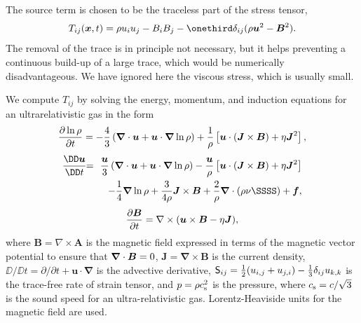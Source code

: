 \documentclass[\mydriver,12pt,twoside,notitlepage,a4paper]{article}
\renewcommand{\vec}[1]{\mbox{\boldmath{$#1$}}}
\newcommand{\Bv}            {\vec{B}}
\newcommand{\Jv}            {\vec{J}}
\newcommand{\fv}            {\vec{f}}
\newcommand{\uv}            {\vec{u}}
\newcommand{\xv}            {\vec{x}}
\newcommand{\cs}            {c_{\rm s}}
\newcommand{\nab}{\mbox{\boldmath $\nabla$} {}}
\begin{document}
The source term is chosen to be the traceless part of the stress tensor,
\begin{equation}
T_{ij}(\xv,t)=\rho u_i u_j - B_i B_j
- \onethird\delta_{ij}(\rho\uv^2-\Bv^2).
\end{equation}
The removal of the trace is in principle not necessary, but it helps
preventing a continuous build-up of a large trace, which would be
numerically disadvantageous.
We have ignored here the viscous stress, which is usually small.

We compute $T_{ij}$ by solving the energy, momentum, and induction
equations for an ultrarelativistic gas in the
form \cite{BEO96,BKMRPTV17}
\begin{equation}
{\partial\ln\rho\over\partial t}=
-\frac{4}{3}\left(\nab\cdot\uv+\uv\cdot\nab\ln\rho\right)
+{1\over\rho}\left[\uv\cdot(\Jv\times\Bv)+\eta\Jv^2\right],
\label{dlnrhodt}
\end{equation}
\vspace{-6mm}
\begin{eqnarray}
{\DD\uv\over\DD t}\!\!&=&\!\!
{\uv\over3}\left(\nab\cdot\uv+\uv\cdot\nab\ln\rho\right)
-{\uv\over\rho}\left[\uv\cdot(\Jv\times\Bv)+\eta\Jv^2\right]
\nonumber
\\
&&-{1\over4}\nab\ln\rho
+{3\over4\rho}\Jv\times\Bv+{2\over\rho}\nab\cdot\left(\rho\nu\SSSS\right)+\fv,
\label{dudt}
\end{eqnarray}
\vspace{-6mm}
\begin{equation}
{\partial\Bv\over\partial t}=\nabla\times(\uv\times\Bv-\eta\Jv),
\label{mhd3}
\end{equation}
where ${\bm B}=\nabla \times {\bm A}$ is the magnetic field expressed
in terms of the magnetic vector potential to ensure that $\nab\cdot\Bv=0$,
$\bm{J}=\bm{\nabla}\times\bm{B}$ is the current density,
$\DD/\DD t=\partial/\partial t +\bm{u}\cdot\bm{\nabla}$
is the advective derivative,
${\sf S}_{ij}=\frac{1}{2}(u_{i,j}+u_{j,i})-\frac{1}{3}\delta_{ij}u_{k,k}$
is the trace-free rate of strain tensor, and $p=\rho\cs^2$ is the pressure,
where $\cs=c/\sqrt{3}$ is the sound speed for an ultra-relativistic gas.
Lorentz-Heaviside units for the magnetic field are used.
\end{document}
